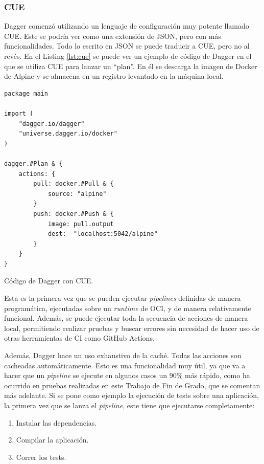 \subsubsection*{CUE}
\label{subsec:cue}

Dagger comenzó utilizando un lenguaje de configuración muy potente llamado CUE\cite{cue}. Este se podría ver como una extensión de JSON, pero con más funcionalidades. Todo lo escrito en JSON se puede traducir a CUE, pero no al revés. En el Listing \ref{lst:cue} se puede ver un ejemplo de código de Dagger en el que se utiliza CUE para lanzar un ``plan''. En él se descarga la imagen de Docker de Alpine y se almacena en un registro levantado en la máquina local.

\begin{listing}[!ht]
  \begin{verbatim}
package main

import (
    "dagger.io/dagger"
    "universe.dagger.io/docker"
)

dagger.#Plan & {
    actions: {
        pull: docker.#Pull & {
            source: "alpine"
        }
        push: docker.#Push & {
            image: pull.output
            dest:  "localhost:5042/alpine"
        }
    }
}
  \end{verbatim}
  \caption{Código de Dagger con CUE.}
  \label{lst:cue}
\end{listing}

Esta es la primera vez que se pueden ejecutar \textit{pipelines} definidas de manera programática, ejecutadas sobre un \textit{runtime} de OCI, y de manera relativamente funcional. Además, se puede ejecutar toda la secuencia de acciones de manera local, permitiendo realizar pruebas y buscar errores sin necesidad de hacer uso de otras herramientas de CI como GitHub Actions\cite{github-actions}.

Además, Dagger hace un uso exhaustivo de la caché. Todas las acciones son cacheadas automáticamente. Esto es una funcionalidad muy útil, ya que va a hacer que un \textit{pipeline} se ejecute en algunos casos un 90\% más rápido, como ha ocurrido en pruebas realizadas en este Trabajo de Fin de Grado, que se comentan más adelante. Si se pone como ejemplo la ejecución de tests sobre una aplicación, la primera vez que se lanza el \textit{pipeline}, este tiene que ejecutarse completamente:

\begin{enumerate}
  \item Instalar las dependencias.
  \item Compilar la aplicación.
  \item Correr los tests.
\end{enumerate}

